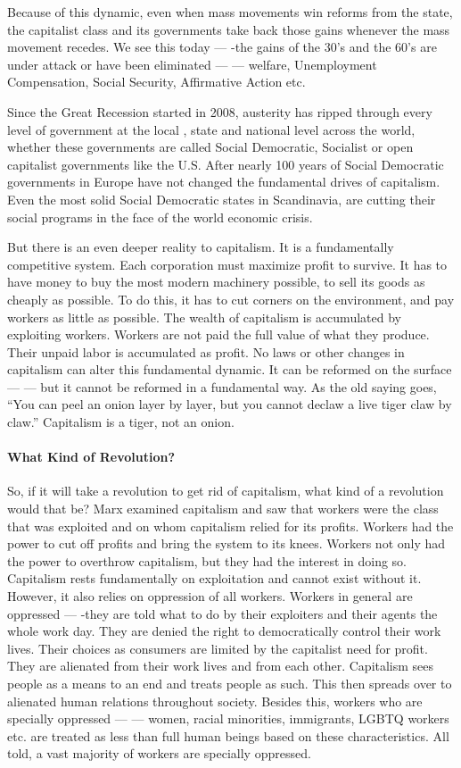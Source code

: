 Because of this dynamic, even when mass movements win reforms from the state, the capitalist class and its governments take back those gains whenever the mass movement recedes. We see this today — -the gains of the 30’s and the 60’s are under attack or have been eliminated — — welfare, Unemployment Compensation, Social Security, Affirmative Action etc.

Since the Great Recession started in 2008, austerity has ripped through every level of government at the local , state and national level across the world, whether these governments are called Social Democratic, Socialist or open capitalist governments like the U.S. After nearly 100 years of Social Democratic governments in Europe have not changed the fundamental drives of capitalism. Even the most solid Social Democratic states in Scandinavia, are cutting their social programs in the face of the world economic crisis.

But there is an even deeper reality to capitalism. It is a fundamentally competitive system. Each corporation must maximize profit to survive. It has to have money to buy the most modern machinery possible, to sell its goods as cheaply as possible. To do this, it has to cut corners on the environment, and pay workers as little as possible. The wealth of capitalism is accumulated by exploiting workers. Workers are not paid the full value of what they produce. Their unpaid labor is accumulated as profit. No laws or other changes in capitalism can alter this fundamental dynamic. It can be reformed on the surface — — but it cannot be reformed in a fundamental way. As the old saying goes, “You can peel an onion layer by layer, but you cannot declaw a live tiger claw by claw.” Capitalism is a tiger, not an onion.

\paragraph{What Kind of Revolution?}

So, if it will take a revolution to get rid of capitalism, what kind of a revolution would that be? Marx examined capitalism and saw that workers were the class that was exploited and on whom capitalism relied for its profits. Workers had the power to cut off profits and bring the system to its knees. Workers not only had the power to overthrow capitalism, but they had the interest in doing so. Capitalism rests fundamentally on exploitation and cannot exist without it. However, it also relies on oppression of all workers. Workers in general are oppressed — -they are told what to do by their exploiters and their agents the whole work day. They are denied the right to democratically control their work lives. Their choices as consumers are limited by the capitalist need for profit. They are alienated from their work lives and from each other. Capitalism sees people as a means to an end and treats people as such. This then spreads over to alienated human relations throughout society. Besides this, workers who are specially oppressed — — women, racial minorities, immigrants, LGBTQ workers etc. are treated as less than full human beings based on these characteristics. All told, a vast majority of workers are specially oppressed.


